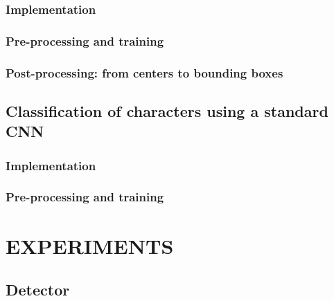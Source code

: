 \documentclass{pasa}%
\begin{document}
\subsubsection{Implementation}
\label{sssec:implementationdet}

\label{ssssec:inputsamples}

\label{ssssec:lossfunctiondet}

\label{ssssec:networkarchitecturedet}

\subsubsection{Pre-processing and training}
\label{sssec:preprocessingdet}

\subsubsection{Post-processing: from centers to bounding boxes}
\label{sssec:preprocessingandtraining}

\subsection{Classification of characters using a standard CNN}
\label{ssec:classificationcnn}

\subsubsection{Implementation}
\label{sssec:implementationclass}

\label{ssssec:networkarchitectureclass}

\label{ssssec:lossfunctionclass}

\subsubsection{Pre-processing and training}
\label{sssec:preprocessingclass}

\section{EXPERIMENTS}
\label{sec:experiments}

\subsection{Detector}
\label{ssec:detectorexp}
\end{document}
